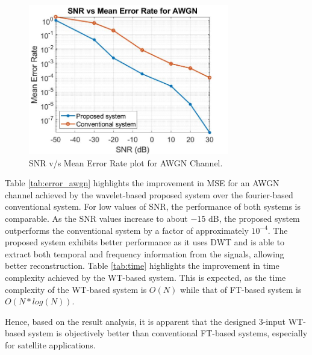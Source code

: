 \documentclass[conference]{IEEEtran}
\begin{document}
\begin{figure}[htpb]
    \centering
    \includegraphics[width=8.75cm]{error_rate_awgn_v3.jpg}
    \caption{SNR v/s Mean Error Rate plot for AWGN Channel.}
    \label{fig:error_plot_awgn}
\end{figure}

Table \ref{tab:error_awgn} highlights the improvement in MSE for an AWGN channel achieved by the wavelet-based proposed system over the fourier-based conventional system. For low values of SNR, the performance of both systems is comparable. As the SNR values increase to about $-15$ dB, the proposed system outperforms the conventional system by a factor of approximately $10^{-4}$. The proposed system exhibits better performance as it uses DWT and is able to extract both temporal and frequency information from the signals, allowing better reconstruction. Table \ref{tab:time} highlights the improvement in time complexity achieved by the WT-based system. This is expected, as the time complexity of the WT-based system is $O(N)$ while that of FT-based system is $O(N*log(N))$.

\begin{table}[htpb]
    \centering
    \caption{Time Complexity of the Proposed and Conventional System.}
    \label{tab:time}
\end{table}

Hence, based on the result analysis, it is apparent that the designed 3-input WT-based system is objectively better than conventional FT-based systems, especially for satellite applications.
\end{document}
